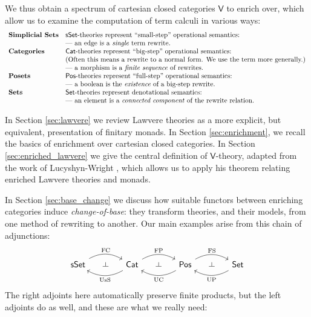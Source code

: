 \documentclass{amsart}
\theoremstyle{definition}
\def\ld{\rotatebox[origin=c]{-90}{$\dashv$}} %
\newcommand{\sSet}{\mathsf{sSet}}
\newcommand{\Set}{\mathsf{Set}}
\newcommand{\Cat}{\mathsf{Cat}}
\newcommand{\Pos}{\mathsf{Pos}}
\newcommand{\V}{\mathsf{V}}
\newcommand{\FC}{\mathrm{FC}}
\newcommand{\FP}{\mathrm{FP}}
\newcommand{\FS}{\mathrm{FS}}
\newcommand{\UC}{\mathrm{UC}}
\newcommand{\UP}{\mathrm{UP}}
\newcommand{\US}{\mathrm{UsS}}
\begin{document}
We thus obtain a spectrum of cartesian closed categories $\V$ to enrich over, which allow us to examine the computation of term calculi in various ways: \\
\[\begin{array}{lll}
\textbf{Simplicial Sets} & \sSet \text{-theories represent ``small-step'' operational semantics:} \\ & \text{--- an edge is a \textit{single} term rewrite.}\\
\textbf{Categories} & \Cat\text{-theories represent ``big-step'' operational semantics:} \\  & \text{(Often this means a rewrite to a normal form. We use the term more generally.)}\\ & \text{--- a morphism is a \textit{finite sequence} of rewrites.}\\
    \textbf{Posets} & \Pos \text{-theories represent ``full-step'' operational semantics:}\\ & \text{--- a boolean is the \textit{existence} of a big-step rewrite.}\\
\textbf{Sets} & \Set \text{-theories represent denotational semantics:} \\ & \text{--- an element is a \textit{connected component} of the rewrite relation.} 
\end{array}\]

In Section \ref{sec:lawvere} we review Lawvere theories as a more explicit, but equivalent, presentation of finitary monads. In Section \ref{sec:enrichment}, we recall the basics of enrichment over cartesian closed categories.   In Section \ref{sec:enriched_lawvere} we give the central definition of $\V$-theory, adapted from the work of Lucyshyn-Wright \cite{lucyshyn-wright}, which allows us to apply his theorem relating enriched Lawvere theories and monads.

In Section \ref{sec:base_change} we discuss how suitable functors between enriching categories induce \textit{change-of-base}: they transform theories, and their models, from one method of rewriting to another.   Our main examples arise from this chain of adjunctions:
\[\begin{tikzcd}[column sep=small]
\sSet  \arrow[bend left,below]{rr}{\FC}
& \ld &
\arrow[bend left,above]{ll}{\US} 
\Cat \arrow[bend left,below]{rr}{\FP}
& \ld &
\arrow[bend left,above]{ll}{\UC} \Pos \arrow[bend left,below]{rr}{\FS}
& \ld &
\Set \arrow[bend left,above]{ll}{\UP}
\end{tikzcd}\]
The right adjoints here automatically preserve finite products, but the left adjoints do as well, and
these are what we really need:
\end{document}
